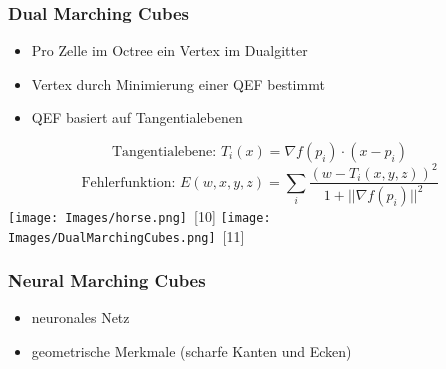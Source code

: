 \documentclass{beamer}
\begin{document}
\begin{frame}[t]
  \frametitle{Dual Marching Cubes}
  \begin{itemize}
    \item Pro Zelle im Octree ein Vertex im Dualgitter
    \item Vertex durch Minimierung einer QEF bestimmt
    \item QEF basiert auf Tangentialebenen
\end{itemize}
\[
  \text{Tangentialebene: } T_i(x) = \nabla f(p_i) \cdot (x - p_i)
\]
\[
  \text{Fehlerfunktion: } E(w, x, y, z) = \sum_i\frac{(w - T_i(x, y, z))^2}{1 + ||\nabla f(p_i)||^2}
\]
\texttt{[image: Images/horse.png]}~\scriptsize[10]
\hspace{1cm}
\texttt{[image: Images/DualMarchingCubes.png]}~\scriptsize[11]
\end{frame}

\begin{frame}[t]
  \frametitle{Neural Marching Cubes}
  \noindent
  \begin{itemize}
    \item neuronales Netz
    \item geometrische Merkmale (scharfe Kanten und Ecken)
  \end{itemize}
\end{frame}

\end{document}
